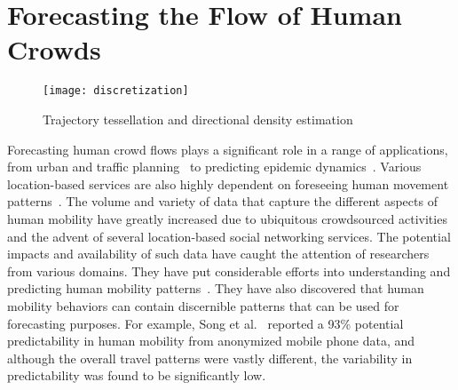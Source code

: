 \chapter{Forecasting the Flow of Human Crowds}

\begin{figure}[tb]
	\centering
	\texttt{[image: discretization]}
	\caption{Trajectory tessellation and directional density estimation}
	\label{fig:segment}
\end{figure}

Forecasting human crowd flows plays a significant role in a range of applications, from urban and traffic planning~\cite{Wei:2012:CPR, Zheng:2011:UCW} to predicting epidemic dynamics~\cite{Dalziel:2013:Human, Eubank:2004:Modelling}.
Various location-based services are also highly dependent on foreseeing human movement patterns~\cite{Bao:2012:Location}.
The volume and variety of data that capture the different aspects of human mobility have greatly increased due to ubiquitous crowdsourced activities and the advent of several location-based social networking services.
The potential impacts and availability of such data have caught the attention of researchers from various domains.
They have put considerable efforts into understanding and predicting human mobility patterns~\cite{Gonzalez:2008:UIH,Xue:2013:Destination,Ying:2011:Semantic}.
They have also discovered that human mobility behaviors can contain discernible patterns that can be used for forecasting purposes. 
For example, Song et al.~\cite{Song:2010:Limits} reported a 93\% potential predictability in human mobility from anonymized mobile phone data, and although the overall travel patterns were vastly different, the variability in predictability was found to be significantly low. 

